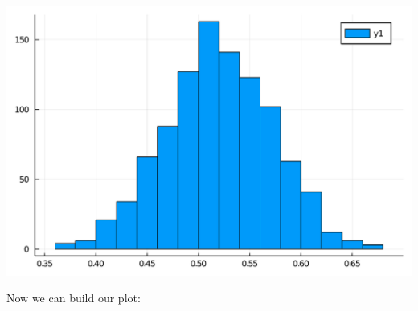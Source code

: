 \documentclass[12pt,a4paper]{article}
\begin{document}
\includegraphics[width=\linewidth]{jl_USrzxA/00_introduction_9_1.pdf}

Now we can build our plot:
\end{document}
